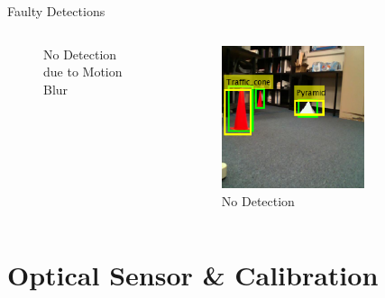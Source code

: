 \documentclass[10pt]{beamer}
\begin{document}
\begin{frame}{Faulty Detections}
\begin{columns}
\begin{figure}
         \caption{No Detection due to Motion Blur}
     \end{figure}
     \vspace{-20pt}
     \begin{figure}
         \centering
         \includegraphics[width=0.7\textwidth]{Images/ft6.png}
         \caption{No Detection}
     \end{figure}  
\end{columns} 
\end{frame}



\section{Optical Sensor \& Calibration}
\end{document}
